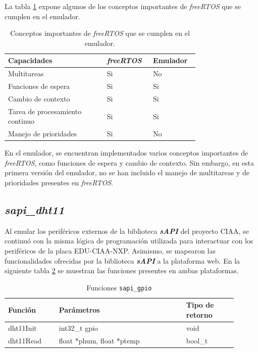 La tabla \ref{tab:ConceptosRTOS} expone algunos de los conceptos importantes de \textit{freeRTOS} que se cumplen en el emulador.

\begin{table}[h]
\centering
\caption[Conceptos importantes de \textit{freeRTOS} que se cumplen en el emulador.]{Conceptos importantes de \textit{freeRTOS} que se cumplen en el emulador.}
\begin{tabular}{p{0.45\linewidth} p{0.15\linewidth}  p{0.15\linewidth}}
\toprule
\textbf{Capacidades} 
& \textbf{\textit{freeRTOS}}
& \textbf{Emulador}
\\
\midrule
Multitareas & Si & No  \\
Funciones de espera &  Si & Si \\
Cambio de contexto &  Si & Si \\
Tarea de procesamiento continuo &  Si & Si \\
Manejo de prioridades & Si & No  \\
\bottomrule
\hline
\end{tabular}
\label{tab:ConceptosRTOS}
\end{table}

En el emulador, se encuentran implementados varios conceptos importantes de \textit{freeRTOS}, como funciones de espera y cambio de contexto. Sin embargo, en esta primera versión del emulador, no se han incluido el manejo de multitareas y de prioridades presentes en \textit{freeRTOS}.


\subsection{\textit{\textbf{sapi\_dht11}}}

Al emular los periféricos externos de la biblioteca \textit{\textbf{sAPI}} del proyecto CIAA, se continuó con la misma lógica de programación utilizada para interactuar con los periféricos de la placa EDU-CIAA-NXP. Asimismo, se mapearon las funcionalidades ofrecidas por la biblioteca \textit{\textbf{sAPI}} a la plataforma web. En la siguiente tabla \ref{tab:sapiDht11} se muestran las funciones presentes en ambas plataformas.


\begin{table}[h]
	\centering
	\caption[Funciones \texttt{sapi\_gpio}]{Funciones \texttt{sapi\_gpio}}
	\begin{tabular}{p{0.20\linewidth} p{0.50\linewidth}  p{0.20\linewidth}}    
		\toprule
		\textbf{Función} 	 & \textbf{Parámetros} 		& \textbf{Tipo de retorno}  \\
		\midrule
		dht11Init & int32\_t gpio		&  void \\		
		dht11Read	 & float *phum, float *ptemp	&  bool\_t \\
		\bottomrule
		\hline
	\end{tabular}
	\label{tab:sapiDht11}
\end{table}

